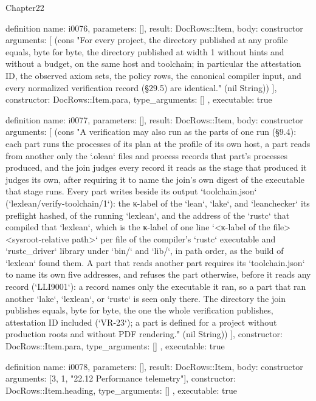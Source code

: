 \begin{lexlean}{Chapter22}
\begin{semanticmodule}
definition{
  name: i0076,
  parameters: [],
  result: DocRows::Item,
  body: constructor{
    arguments: [
      (cons "For every project, the directory published at any profile equals, byte for byte, the directory published at width 1 without hints and without a budget, on the same host and toolchain; in particular the attestation ID, the observed axiom sets, the policy rows, the canonical compiler input, and every normalized verification record (§29.5) are identical." (nil String))
    ],
    constructor: DocRows::Item.para,
    type_arguments: []
  },
  executable: true
}

definition{
  name: i0077,
  parameters: [],
  result: DocRows::Item,
  body: constructor{
    arguments: [
      (cons "A verification may also run as the parts of one run (§9.4): each part runs the processes of its plan at the profile of its own host, a part reads from another only the `.olean` files and process records that part's processes produced, and the join judges every record it reads as the stage that produced it judges its own, after requiring it to name the join's own digest of the executable that stage runs. Every part writes beside its output `toolchain.json` (`lexlean/verify-toolchain/1`): the κ-label of the `lean`, `lake`, and `leanchecker` its preflight hashed, of the running `lexlean`, and the address of the `rustc` that compiled that `lexlean`, which is the κ-label of one line `<κ-label of the file>  <sysroot-relative path>` per file of the compiler's `rustc` executable and `rustc_driver` library under `bin/` and `lib/`, in path order, as the build of `lexlean` found them. A part that reads another part requires its `toolchain.json` to name its own five addresses, and refuses the part otherwise, before it reads any record (`LLI9001`): a record names only the executable it ran, so a part that ran another `lake`, `lexlean`, or `rustc` is seen only there. The directory the join publishes equals, byte for byte, the one the whole verification publishes, attestation ID included (`VR-23`); a part is defined for a project without production roots and without PDF rendering." (nil String))
    ],
    constructor: DocRows::Item.para,
    type_arguments: []
  },
  executable: true
}

definition{
  name: i0078,
  parameters: [],
  result: DocRows::Item,
  body: constructor{
    arguments: [3, 1, "22.12 Performance telemetry"],
    constructor: DocRows::Item.heading,
    type_arguments: []
  },
  executable: true
}


\end{semanticmodule}
\end{lexlean}

